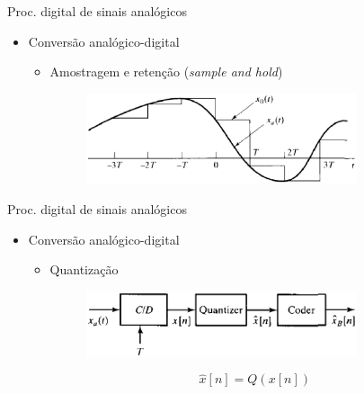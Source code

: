 \begin{slide}{Proc. digital de sinais anal\'ogicos}
\begin{itemize}
   \item Conversão analógico-digital
   \begin{itemize}
      \item Amostragem e retenção (\emph{sample and hold})
      \begin{figure}
        \centering
         \includegraphics[width = 0.8\textwidth]{figs/ad_conv3.eps}
      \end{figure}

   \end{itemize}
\end{itemize}
\end{slide}

\begin{slide}{Proc. digital de sinais anal\'ogicos}
\begin{itemize}
   \item Conversão analógico-digital
   \begin{itemize}
      \item Quantização 
      \begin{figure}
        \centering
         \includegraphics[width = 0.8\textwidth]{figs/ad_conv4.eps}
      \end{figure}
\begin{equation}
          \hat x[n] = Q(x[n])
      \end{equation}
   \end{itemize}
\end{itemize}
\end{slide}

